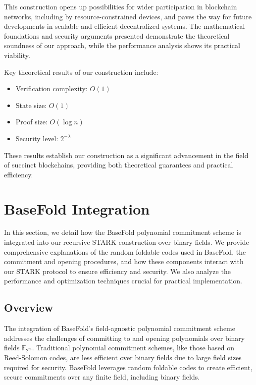\documentclass{article}
\theoremstyle{plain}
\theoremstyle{definition}
\theoremstyle{remark}
\theoremstyle{problem}
\begin{document}
This construction opens up possibilities for wider participation in blockchain networks, including by resource-constrained devices, and paves the way for future developments in scalable and efficient decentralized systems. The mathematical foundations and security arguments presented demonstrate the theoretical soundness of our approach, while the performance analysis shows its practical viability.

Key theoretical results of our construction include:
\begin{itemize}
    \item Verification complexity: $O(1)$
    \item State size: $O(1)$
    \item Proof size: $O(\log n)$
    \item Security level: $2^{-\lambda}$
\end{itemize}

These results establish our construction as a significant advancement in the field of succinct blockchains, providing both theoretical guarantees and practical efficiency.

\section{BaseFold Integration}

In this section, we detail how the BaseFold polynomial commitment scheme is integrated into our recursive STARK construction over binary fields. We provide comprehensive explanations of the random foldable codes used in BaseFold, the commitment and opening procedures, and how these components interact with our STARK protocol to ensure efficiency and security. We also analyze the performance and optimization techniques crucial for practical implementation.

\subsection{Overview}

The integration of BaseFold's field-agnostic polynomial commitment scheme addresses the challenges of committing to and opening polynomials over binary fields $\mathbb{F}_{2^m}$. Traditional polynomial commitment schemes, like those based on Reed-Solomon codes, are less efficient over binary fields due to large field sizes required for security. BaseFold leverages random foldable codes to create efficient, secure commitments over any finite field, including binary fields.
\end{document}
